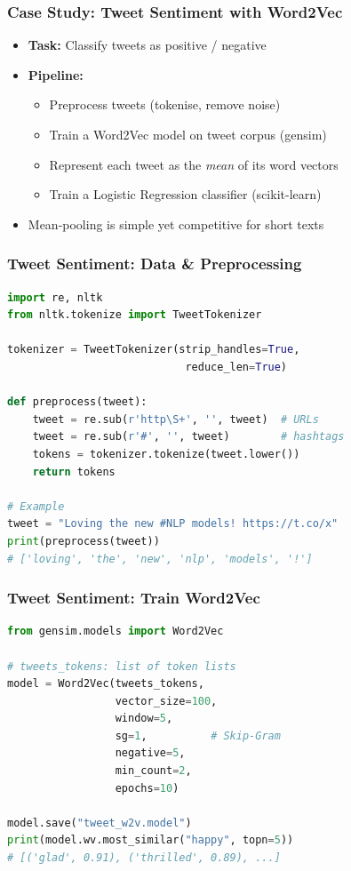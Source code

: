 \begin{frame}[fragile]\frametitle{Case Study: Tweet Sentiment with Word2Vec}
\begin{itemize}
  \item \textbf{Task:} Classify tweets as positive / negative
  \item \textbf{Pipeline:}
  \begin{itemize}
    \item Preprocess tweets (tokenise, remove noise)
    \item Train a Word2Vec model on tweet corpus (gensim)
    \item Represent each tweet as the \textit{mean} of its word vectors
    \item Train a Logistic Regression classifier (scikit-learn)
  \end{itemize}
  \item Mean-pooling is simple yet competitive for short texts
\end{itemize}
\end{frame}

\begin{frame}[fragile]\frametitle{Tweet Sentiment: Data \& Preprocessing}
\begin{lstlisting}[language=Python]
import re, nltk
from nltk.tokenize import TweetTokenizer

tokenizer = TweetTokenizer(strip_handles=True,
                            reduce_len=True)

def preprocess(tweet):
    tweet = re.sub(r'http\S+', '', tweet)  # URLs
    tweet = re.sub(r'#', '', tweet)        # hashtags
    tokens = tokenizer.tokenize(tweet.lower())
    return tokens

# Example
tweet = "Loving the new #NLP models! https://t.co/x"
print(preprocess(tweet))
# ['loving', 'the', 'new', 'nlp', 'models', '!']
\end{lstlisting}
\end{frame}

\begin{frame}[fragile]\frametitle{Tweet Sentiment: Train Word2Vec}
\begin{lstlisting}[language=Python]
from gensim.models import Word2Vec

# tweets_tokens: list of token lists
model = Word2Vec(tweets_tokens,
                 vector_size=100,
                 window=5,
                 sg=1,          # Skip-Gram
                 negative=5,
                 min_count=2,
                 epochs=10)

model.save("tweet_w2v.model")
print(model.wv.most_similar("happy", topn=5))
# [('glad', 0.91), ('thrilled', 0.89), ...]
\end{lstlisting}
\end{frame}

